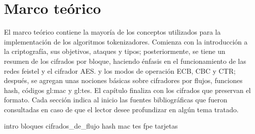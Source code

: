 %
%

\chapter{Marco teórico}
\label{sec:marco_teorico}
El marco teórico contiene la mayoría de los conceptos utilizados para la
implementación de los algoritmos tokenizadores. Comienza con la introducción a
la criptografía, sus objetivos, ataques y tipos; posteriormente, se tiene un
resumen de los cifrados por bloque, haciendo énfasis en el funcionamiento de las
redes feistel y el cifrador AES. y los modos de operación ECB, CBC y CTR;
después, se agregan unas nociones básicas sobre cifradores por flujos, funciones
hash, códigos \gls{gl:mac} y \gls{gl:tes}. El capítulo finaliza con los cifrados
que preservan el formato. Cada sección indica al inicio las fuentes
bibliográficas que fueron consultadas en caso de que el lector desee profundizar
en algún tema tratado. 

{intro}
{bloques}
{cifrados_de_flujo}
{hash}
{mac}
{tes}
{fpe}
{tarjetas}
